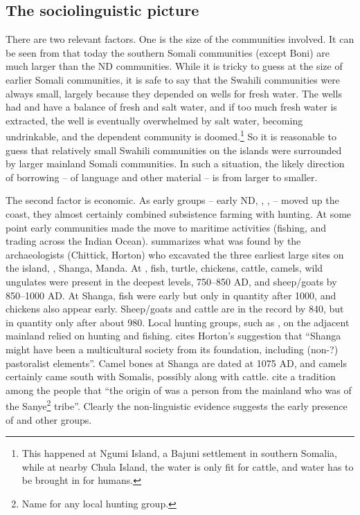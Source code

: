 \documentclass[output=paper,newtxmath,modfonts,nonflat,hidelinks]{langsci/langscibook}
\begin{document}
\subsection{The sociolinguistic picture}\label{sec:nurse:5.3} There are two relevant factors. One is the size of the communities involved. It can be seen from  that today the southern Somali communities (except Boni) are much larger than the ND communities. While it is tricky to guess at the size of earlier Somali communities, it is safe to say that the Swahili communities were always small, largely because they depended on wells for fresh water. The wells had and have a balance of fresh and salt water, and if too much fresh water is extracted, the well is eventually overwhelmed by salt water, becoming undrinkable, and the dependent community is doomed.\footnote{This happened at Ngumi Island, a Bajuni settlement in southern Somalia, while at nearby Chula Island, the water is only fit for cattle, and water has to be brought in for humans.}  So it is reasonable to guess that relatively small Swahili communities on the islands were surrounded by larger mainland Somali communities. In such a situation, the likely direction of borrowing – of language and other material – is from larger to smaller. 

  The second factor is economic. As early  groups – early ND, , ,  -- moved up the coast, they almost certainly combined subsistence farming with hunting. At some point early  communities made the move to maritime activities (fishing, and trading across the Indian Ocean). \citet{Wilson2016} summarizes what was found by the archaeologists \linebreak(Chittick, Horton) who excavated the three earliest large sites on the island, , Shanga, Manda. At , fish, turtle, chickens, cattle, camels, wild ungulates were present in the deepest levels, 750--850 AD, and sheep/goats by 850--1000 AD. At Shanga, fish were early but only in quantity after 1000, and chickens also appear early. Sheep/goats and cattle are in the record by 840, but in quantity only after about 980. Local hunting groups, such as , on the adjacent mainland relied on hunting and fishing. \citet[132]{Wilson2016} cites Horton’s suggestion that “Shanga might have been a multicultural society from its foundation, including (non-?) pastoralist elements”. Camel bones at Shanga are dated at 1075 AD, and camels certainly came south with Somalis, possibly along with cattle. \citet[72]{Nurse1985} cite a tradition among the  people that “the origin of  was a person from the mainland who was of the Sanye\footnote{Name for any local hunting group.} tribe”. Clearly the non-linguistic evidence suggests the early presence of  and other groups.
\end{document}
